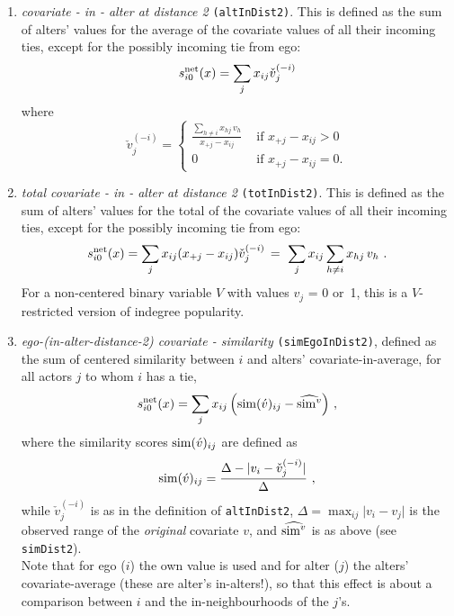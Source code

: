 \documentclass[a4paper,fleqn,11pt]{article}
\newcommand{\+}{\, + \,}
\newcommand{\vit}{\theenumi}
\newcounter{savenumi}
\begin{document}
\begin{enumerate}
\item \emph{covariate - in - alter at distance 2} \texttt{(altInDist2)}.
     This is defined as the sum of alters' values for
     the average of the covariate values of all their
     incoming ties, except for the possibly incoming tie from ego:
\[
 s^{\rm net}_{i\vit}(x) = \sum_j x_{ij} \check v_j^{(-i)}
\]
      where
\begin{equation}
  \check v_j^{(-i)} = \left\{\begin{array}{ll} \displaystyle
         \frac{\sum_{h \neq i} x_{hj}\,v_h}{x_{+j} - x_{ij}}  &
                                       \text{ if } x_{+j} - x_{ij} > 0     \\
         0                                &  \text{ if } x_{+j}- x_{ij} = 0  .
  \end{array}   \right.            \label{alt_inav2}
\end{equation}


\item \emph{total covariate - in - alter at distance 2} \texttt{(totInDist2)}.
     This is defined as the sum of alters' values for
     the total of the covariate values of all their incoming ties,
     except for the possibly incoming tie from ego:
\[
 s^{\rm net}_{i\vit}(x) = \sum_j x_{ij} (x_{+j} - x_{ij}) \check v_j^{(-i)}
                        \,=\ \sum_j x_{ij} \sum_{h \neq i} x_{hj}\,v_h  \ .
\]
    For a non-centered binary variable $V$ with values $v_j$ = 0 or~1,
    this is a $V$-restricted version of indegree popularity.

\item \emph{ego-(in-alter-distance-2) covariate - similarity} \texttt{(simEgoInDist2)},
      defined as the sum of centered similarity  between $i$
      and alters' covariate-in-average, for all actors
      $j$ to whom $i$ has a tie,
\[
 s^{\rm net}_{i\vit}(x) = \sum_j x_{ij}\, \Big({\rm sim}(\acute v)_{ij}
  - \widehat{{\rm sim}^v} \Big) \ ,
\]
 where the similarity scores ${\rm sim}(\acute v)_{ij}$ are defined as
\[
{\rm sim}(\acute v)_{ij}=
 \frac{\Delta-\vert  v_i - \check v_j^{(-i)} \vert}{\Delta} \ ,
\]
 while
 $ \check v_j^{(-i)}$ is as in the definition of \texttt{altInDist2},
 $\Delta=\max_{ij}\vert v_i - v_j \vert$ is the observed range of the
 \emph{original} covariate $v$, and $\widehat{{\rm sim}^v}$ is as above
 (see \texttt{simDist2}).\\
  Note that for ego ($i$) the own value is used and for alter ($j$) the alters' covariate-average
  (these are alter's in-alters!), so that this effect is about a comparison between $i$
   and the in-neighbourhoods of the $j$'s.

\setcounter{savenumi}{\value{enumi}}
\end{enumerate}
\end{document}
